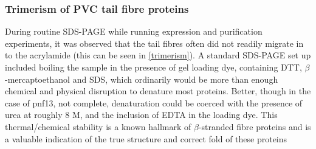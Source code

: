 \subsubsection{Trimerism of PVC tail fibre proteins}
During routine SDS-PAGE while running expression and purification experiments, it was observed that the tail fibres often did not readily migrate in to the acrylamide (this can be seen in \vref{trimerism}). A standard SDS-PAGE set up included boiling the sample in the presence of gel loading dye, containing DTT, $\beta$-mercaptoethanol and SDS, which ordinarily would be more than enough chemical and physical disruption to denature most proteins. Better, though in the case of pnf13, not complete, denaturation could be coerced with the presence of urea at roughly 8 M, and the inclusion of EDTA in the loading dye. This thermal/chemical stability is a known hallmark of $\beta$-stranded fibre proteins and is a valuable indication of the true structure and correct fold of these proteins \citep{Papanikolopoulou2008, Gazit2008}

